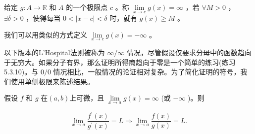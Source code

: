 \begin{Def}
  \label{def:5.3.7}
  给定 \(g : A \rightarrow  \mathbb{R}\) 和 \(A\) 的一个极限点 \(c\) 。称 \(\mathop{\lim }\limits_{{x \rightarrow  c}}g\left( x\right)  = \infty\) ，若 \(\forall M > 0\) ， \(\exists \delta  > 0\) ，使得每当 \(0 < \left| {x - c}\right|  < \delta\) 时，就有 \(g\left( x\right)  \geq  M\) 。
\end{Def}

我们可以用类似的方式定义 \(\mathop{\lim }\limits_{{x \rightarrow  c}}g\left( x\right)  =  - \infty\) 。

以下版本的L'Hospital法则被称为 \(\infty /\infty\) 情况，尽管假设仅要求分母中的函数趋向于无穷大。如果分子有界，那么证明所得商趋向于零是一个简单的练习(练习5.3.10)。与 \(0/0\) 情况相比，一般情况的论证相对复杂。为了简化证明的符号，我们使用单侧极限来陈述结果。

\begin{Thm}
  \label{thm:5.3.8}
  假设 \(f\) 和 \(g\) 在$(a, b)$上可微，且 \(\mathop{\lim }\limits_{{x \rightarrow  a}}g\left( x\right)  = \infty\) (或 \(- \infty\) )。则

\[
\mathop{\lim }\limits_{{x \rightarrow  a}}\frac{{f}^{\prime }\left( x\right) }{{g}^{\prime }\left( x\right) } = L\Rightarrow \mathop{\lim }\limits_{{x \rightarrow  a}}\frac{f\left( x\right) }{g\left( x\right) } = L.
\]
\end{Thm}

